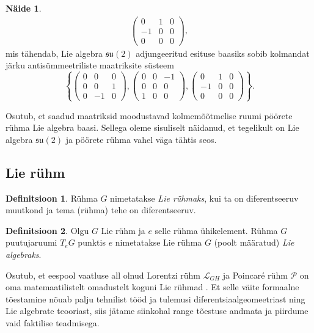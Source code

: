 \documentclass[12pt,a4paper,oneside]{article}
\theoremstyle{plain}
\theoremstyle{definition}
\newtheorem{definitsioon}{Definitsioon}[section]
\newtheorem{naide}{Näide}[section]
\numberwithin{equation}{section}
\def\L{{\mathcal L}}
\def\P{{\mathcal P}}
\def\su2{{\mathfrak{ su}\left(2\right)}}
\begin{document}
\begin{naide}
\begin{align*}
\begin{pmatrix}
0 & 1 & 0 \\
-1 & 0 & 0 \\
0 & 0 & 0
\end{pmatrix},
\end{align*}
mis tähendab, Lie algebra $\su2$ adjungeeritud esituse baasiks sobib 
kolmandat järku antisümmeetriliste maatriksite süsteem 
\[\left\lbrace \begin{pmatrix}
0 & 0 & 0 \\
0 & 0 & 1 \\
0 & -1 & 0
\end{pmatrix}, \begin{pmatrix}
0 & 0 & -1 \\
0 & 0 & 0 \\
1 & 0 & 0
\end{pmatrix}, \begin{pmatrix}
0 & 1 & 0 \\
-1 & 0 & 0 \\
0 & 0 & 0
\end{pmatrix} \right\rbrace.\]
\end{naide}

Osutub, et saadud maatriksid moodustavad kolmemõõtmelise ruumi 
pöörete rühma Lie algebra baasi. Sellega oleme sisuliselt näidanud, 
et tegelikult on Lie algebra $\su2$ ja pöörete rühma vahel väga 
tähtis seos.

\subsection{Lie rühm} \label{ptk:lie_ryhm}

\begin{definitsioon}
Rühma $G$ nimetatakse \emph{Lie rühmaks}, kui ta on diferentseeruv 
muutkond ja tema (rühma) tehe on diferentseeruv.
\end{definitsioon}

\begin{definitsioon}
Olgu $G$ Lie rühm ja $e$ selle rühma ühikelement. Rühma $G$ 
puutujaruumi $T_e G$ punktis $e$ nimetatakse Lie rühma $G$ (poolt 
määratud) \emph{Lie algebraks}.
\end{definitsioon}

Osutub, et eespool vaatluse all olnud Lorentzi rühm $\L_{GH}$ ja 
Poincar\'e rühm $\P$ on oma matemaatilistelt omadustelt koguni Lie 
rühmad \cite[peatükk Poincar\'e algebra]{Super}. Et selle väite 
formaalne tõestamine nõuab palju tehnilist tööd ja tulemusi 
diferentsiaalgeomeetriast ning Lie algebrate teooriast, siis jätame 
siinkohal range tõestuse andmata ja piirdume vaid faktilise 
teadmisega.
\end{document}
